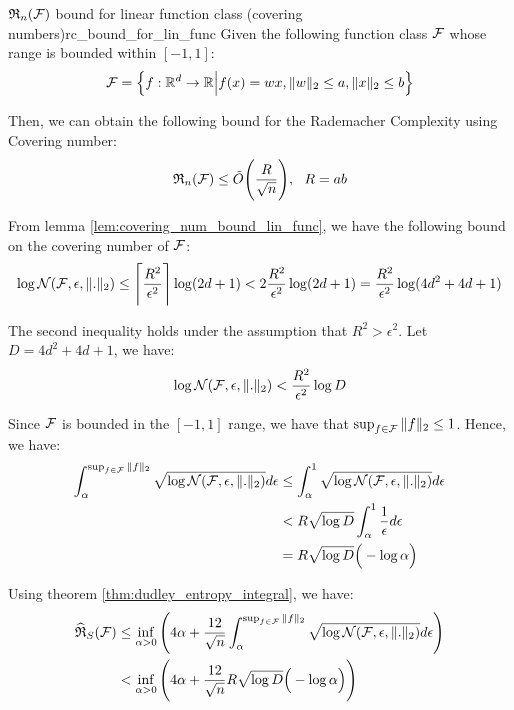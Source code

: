 \begin{proposition}{$\mathfrak{R}_n(\mathcal{F})$ bound for linear function class (covering numbers)}{rc_bound_for_lin_func}
    Given the following function class $\mathcal{F}$ whose range is bounded within $[-1, 1]$:
    \begin{align*}
        \mathcal{F} = \Big\{ 
            f:\mathbb{R}^d\to\mathbb{R} \Big| f(x) = wx, \|w\|_2 \le a, \|x\|_2 \le b
         \Big\}
    \end{align*}

    \noindent Then, we can obtain the following bound for the Rademacher Complexity using Covering number:
    \begin{align*}
        \mathfrak{R}_n(\mathcal{F}) \le \tilde O \Bigg( \frac{R}{\sqrt{n}} \Bigg), \ \ R = ab
    \end{align*}
\end{proposition}
\begin{proof*}
    \noindent From lemma \ref{lem:covering_num_bound_lin_func}, we have the following bound on the covering number of $\mathcal{F}$:
    \begin{align*}
        \log\mathcal{N}(\mathcal{F}, \epsilon, \|.\|_2) \le \Bigg\lceil \frac{R^2}{\epsilon^2} \Bigg\rceil \log(2d+1) < 2\frac{R^2}{\epsilon^2}\log(2d+1) = \frac{R^2}{\epsilon^2}\log(4d^2 + 4d + 1)
    \end{align*}

    \noindent The second inequality holds under the assumption that $R^2 > \epsilon^2$. Let $D = 4d^2 + 4d + 1$, we have:
    \begin{align*}
        \log\mathcal{N}(\mathcal{F}, \epsilon, \|.\|_2) < \frac{R^2}{\epsilon^2} \log D
    \end{align*}

    \noindent Since $\mathcal{F}$ is bounded in the $[-1, 1]$ range, we have that $\sup_{f\in\mathcal{F}}\|f\|_2 \le 1$. Hence, we have:
    \begin{align*}
        \int_\alpha^{\sup_{f\in\mathcal{F}}\|f\|_2} \sqrt{\log\mathcal{N}(\mathcal{F}, \epsilon, \|.\|_2)} d\epsilon
            &\le \int_\alpha^1 \sqrt{\log\mathcal{N}(\mathcal{F}, \epsilon, \|.\|_2)} d\epsilon \\
            &< R\sqrt{\log D}\int_\alpha^1 \frac{1}{\epsilon}d\epsilon \\
            &= R\sqrt{\log D}\Big(  - \log\alpha  \Big)
    \end{align*}

    \noindent Using theorem \ref{thm:dudley_entropy_integral}, we have:
    \begin{align*}
        \widehat{\mathfrak{R}}_S(\mathcal{F}) 
            &\le \inf_{\alpha>0}\Bigg( 
                4\alpha + \frac{12}{\sqrt n} \int_\alpha^{\sup_{f\in\mathcal{F}}\|f\|_2} \sqrt{\log\mathcal{N}(\mathcal{F}, \epsilon, \|.\|_2)} d\epsilon
             \Bigg) \\
            &< \inf_{\alpha>0}\Bigg( 
                4\alpha + \frac{12}{\sqrt n} R\sqrt{\log D} \Big(  - \log\alpha  \Big)
             \Bigg)
    \end{align*}


\end{proof*}
